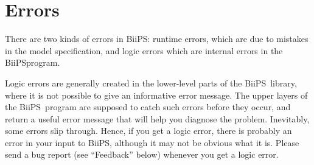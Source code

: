 \documentclass[11pt, a4paper, titlepage]{report}
\newcommand{\biips}{\textsf{BiiPS}}
\begin{document}
% 
% 
% 
% 

\section{Errors}

There are two kinds of errors in \biips: runtime errors, which are due to
mistakes in the model specification, and logic errors which are internal
errors in the \biips program. 

Logic errors are generally created in the lower-level parts of the \biips\
library, where it is not possible to give an informative error message.
The upper layers of the \biips\ program are supposed to catch such errors
before they occur, and return a useful error message that will help you
diagnose the problem.  Inevitably, some errors slip through. Hence,
if you get a logic error, there is probably an error in your input to
\biips, although it may not be obvious what it is. Please send a bug
report (see ``Feedback'' below) whenever you get a logic error.
\end{document}
